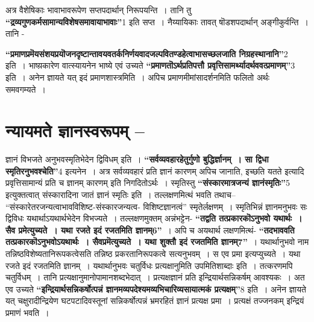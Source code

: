 {अत्र वैशेषिकाः भावाभावरूपेण सप्तपदार्थान् निरूपयन्ति~। तानि तु \textbf{“द्रव्यगुणकर्म\-सामान्यविशेषसमावायाभावाः”}1 इति सप्त~। नैय्यायिकाः तावत् षॊडशपदार्थान् अङ्गीकुर्वन्ति~। तानि -

\textbf{“प्रमाणप्रमॆयसंशयप्रयॊजनदृष्टान्तावयवतर्कनिर्णयवादजल्पवितण्डहेत्वा\-\break भासच्छलजाति निग्रहस्थानानि”}2 इति~। भाष्य़कारेण वात्स्यायनेन भाष्ये एवं उच्यते \textbf{“प्रमाणतॊऽर्थप्रतिपत्तौ प्रवृत्तिसामर्थ्यादर्थववत्प्रमाणम्”}3 इति~। अनेन ज्ञायते यत् इदं प्रमाणशास्त्रमिति~। अपिच प्रमाणमीमांसादर्शनमिति फलितो अर्थः समवगम्यते~। 

\section*{न्यायमते ज्ञानस्वरूपम् –}

ज्ञानं विभजते अनुभवस्मृतिभेदेन द्विविधम् इति~। \textbf{“सर्वव्यवहारहेतुर्गुणो बुद्धिर्ज्ञानम्~। सा द्विधा स्मृतिरनुभवश्चेति”}4 इत्यनेन~। अत्र सर्वव्यवहारं प्रति ज्ञानं कारणम् अपिच जानाति, इच्छति यतते इत्यादि प्रवृत्तिसामान्यं प्रति च ज्ञानम् कारणम् इति निगदितोऽर्थः~। स्मृतिस्तु \textbf{“संस्कारमात्रजन्यं ज्ञानंस्मृतिः”}5 इत्युक्तत्वात् संस्कारादिना जातं ज्ञानं स्मृतिः इति~। तल्लक्षणमित्थं भवति तथाच– “संस्कारेतरजन्यत्वाभावविशिष्ट-संस्कारजन्यत्व- विशिष्टज्ञानत्वं” स्मृतेर्लक्षणम्~। स्मृतिभिन्नं ज्ञानमनुभवः सः द्विविधः यथार्थाऽयथार्थभेदेन विभज्यते~। तल्लक्षणमुक्तम् अन्नंभट्टेन- \textbf{“तद्वति तत्प्रकारकॊऽनुभवो यथार्थः~। सैव प्रमेत्युच्यते~। यथा रजते इदं रजतमिति ज्ञानम्6”}~। अपि च अयथार्थ लक्षणमित्थं- \textbf{“तदभाववति तत्प्रकारकॊऽनुभवोऽयथार्थः~। सैवप्रमॆत्युच्यते~। यथा शुक्तौ इदं रजतमिति ज्ञानम्7”}~। यथार्थानुभवो नाम तन्निष्ठविशेष्यतानिरूपकत्वेसति तन्निष्ठ प्रकरतानिरूपकत्वे सत्यनुभवम्~। स एव प्रमा इत्यप्युच्यते~। यथा रजते इदं रजतमिति ज्ञानम्~। यथार्थानुभवः चतुर्विधः प्रत्यक्षानुमिति उपमितिशाब्दाः इति~। तत्करणमपि चतुर्विधम्~। तानि प्रत्यक्षानुमानोपामानशब्दभेदात्~। प्रत्यक्षज्ञानं प्रति इन्द्रियार्थसन्निकर्षम् आवश्यकः~। अत एव उच्यते \textbf{“इन्द्रियार्थसन्निकर्षोत्पन्नं ज्ञानमव्यपदेश्यमव्यभिचारिव्यसायात्मकं प्रत्यक्षम्”}8 इति~। अनॆन ज्ञायते यत् चक्षुरादीन्द्रियेण घटपटादिवस्तूनां सन्निकर्षोत्पन्नं भ्रमरहितं ज्ञानं प्रत्यक्ष प्रमा~। प्रत्यक्षं तज्जनकम् इन्द्रियं प्रमाणं भवति~। 

}
